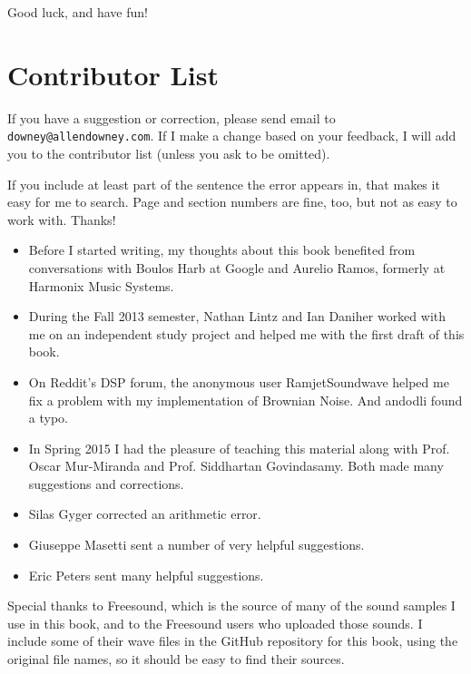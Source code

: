\documentclass[12pt]{book}
\begin{document}
Good luck, and have fun!



\section*{Contributor List}

If you have a suggestion or correction, please send email to 
{\tt downey@allendowney.com}.  If I make a change based on your
feedback, I will add you to the contributor list
(unless you ask to be omitted).

If you include at least part of the sentence the
error appears in, that makes it easy for me to search.  Page and
section numbers are fine, too, but not as easy to work with.
Thanks!

\small

\begin{itemize}

\item Before I started writing, my thoughts about this book
benefited from conversations with Boulos Harb at Google and
Aurelio Ramos, formerly at Harmonix Music Systems.

\item During the Fall 2013 semester, Nathan Lintz and Ian Daniher
worked with me on an independent study project and helped me with
the first draft of this book.

\item On Reddit's DSP forum, the anonymous user RamjetSoundwave
helped me fix a problem with my implementation of Brownian Noise.
And andodli found a typo.

\item In Spring 2015 I had the pleasure of teaching this material
along with Prof. Oscar Mur-Miranda and Prof. Siddhartan Govindasamy.
Both made many suggestions and corrections.

\item Silas Gyger corrected an arithmetic error.

\item Giuseppe Masetti sent a number of very helpful suggestions.

\item Eric Peters sent many helpful suggestions.


\end{itemize}


Special thanks to Freesound, which is the source of many of the
sound samples I use in this book, and to the Freesound users who
uploaded those sounds.  I include some of their wave files in
the GitHub repository for this book, using the original file
names, so it should be easy to find their sources.
\end{document}
